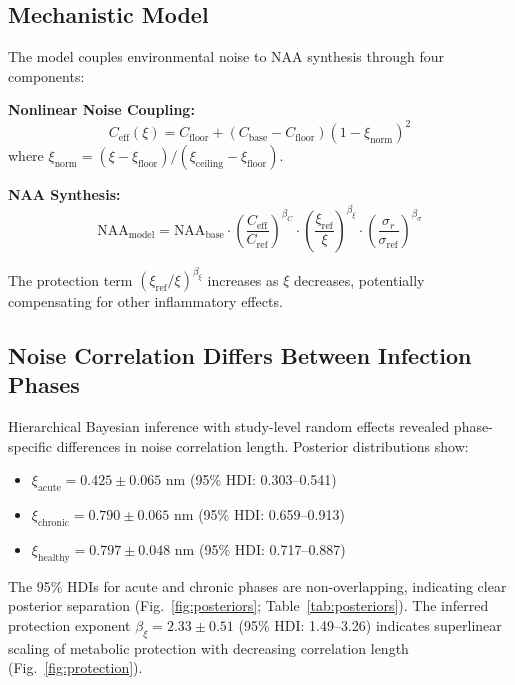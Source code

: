 \documentclass[10pt,a4paper]{article}
\begin{document}
\subsection{Mechanistic Model}

The model couples environmental noise to NAA synthesis through four components:

\textbf{Nonlinear Noise Coupling:}
\begin{equation}
C_{\text{eff}}(\xi) = C_{\text{floor}} + (C_{\text{base}} - C_{\text{floor}})(1 - \xi_{\text{norm}})^2
\end{equation}
where $\xi_{\text{norm}} = (\xi - \xi_{\text{floor}})/(\xi_{\text{ceiling}} - \xi_{\text{floor}})$.

\textbf{NAA Synthesis:}
\begin{equation}
\text{NAA}_{\text{model}} = \text{NAA}_{\text{base}} \cdot \left(\frac{C_{\text{eff}}}{C_{\text{ref}}}\right)^{\beta_C} \cdot \left(\frac{\xi_{\text{ref}}}{\xi}\right)^{\beta_\xi} \cdot \left(\frac{\sigma_r}{\sigma_{\text{ref}}}\right)^{\beta_\sigma}
\end{equation}

The protection term $(\xi_{\text{ref}}/\xi)^{\beta_\xi}$ increases as $\xi$ decreases, potentially compensating for other inflammatory effects.

\subsection{Noise Correlation Differs Between Infection Phases}

Hierarchical Bayesian inference with study-level random effects revealed phase-specific differences in noise correlation length. Posterior distributions show:

\begin{itemize}
\item $\xi_{\text{acute}} = 0.425 \pm 0.065$ nm (95\% HDI: 0.303--0.541)
\item $\xi_{\text{chronic}} = 0.790 \pm 0.065$ nm (95\% HDI: 0.659--0.913)
\item $\xi_{\text{healthy}} = 0.797 \pm 0.048$ nm (95\% HDI: 0.717--0.887)
\end{itemize}

The 95\% HDIs for acute and chronic phases are non-overlapping, indicating clear posterior separation (Fig.~\ref{fig:posteriors}; Table~\ref{tab:posteriors}). The inferred protection exponent $\beta_\xi = 2.33 \pm 0.51$ (95\% HDI: 1.49--3.26) indicates superlinear scaling of metabolic protection with decreasing correlation length (Fig.~\ref{fig:protection}).
\end{document}
